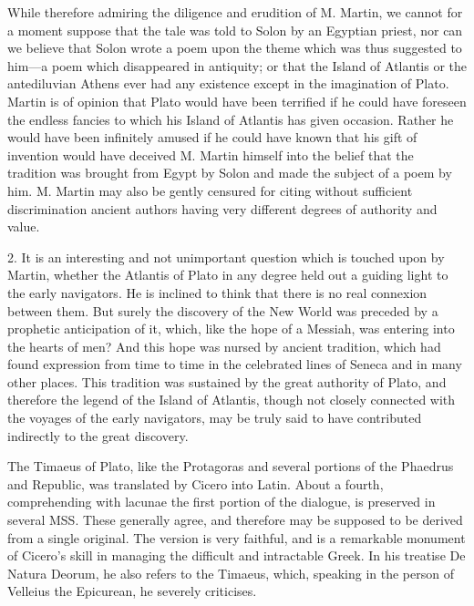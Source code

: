 While therefore admiring the diligence and erudition of M. Martin, we
cannot for a moment suppose that the tale was told to Solon by an Egyptian
priest, nor can we believe that Solon wrote a poem upon the theme which
was thus suggested to him—a poem which disappeared in antiquity; or
that the Island of Atlantis or the antediluvian Athens ever had any
existence except in the imagination of Plato. Martin is of opinion that
Plato would have been terrified if he could have foreseen the endless
fancies to which his Island of Atlantis has given occasion. Rather he
would have been infinitely amused if he could have known that his gift of
invention would have deceived M. Martin himself into the belief that the
tradition was brought from Egypt by Solon and made the subject of a poem
by him. M. Martin may also be gently censured for citing without
sufficient discrimination ancient authors having very different degrees of
authority and value.

2. It is an interesting and not unimportant question which is touched upon
by Martin, whether the Atlantis of Plato in any degree held out a guiding
light to the early navigators. He is inclined to think that there is no
real connexion between them. But surely the discovery of the New World was
preceded by a prophetic anticipation of it, which, like the hope of a
Messiah, was entering into the hearts of men? And this hope was nursed by
ancient tradition, which had found expression from time to time in the
celebrated lines of Seneca and in many other places. This tradition was
sustained by the great authority of Plato, and therefore the legend of the
Island of Atlantis, though not closely connected with the voyages of the
early navigators, may be truly said to have contributed indirectly to the
great discovery.

The Timaeus of Plato, like the Protagoras and several portions of the
Phaedrus and Republic, was translated by Cicero into Latin. About a
fourth, comprehending with lacunae the first portion of the dialogue, is
preserved in several MSS. These generally agree, and therefore may be
supposed to be derived from a single original. The version is very
faithful, and is a remarkable monument of Cicero’s skill in managing the
difficult and intractable Greek. In his treatise De Natura Deorum, he also
refers to the Timaeus, which, speaking in the person of Velleius the
Epicurean, he severely criticises.


